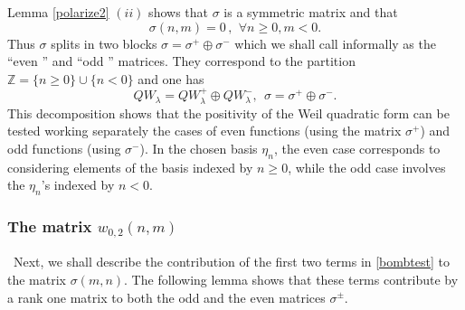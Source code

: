 \documentclass[cupthm]{CUP-JNL-JMJ}
\def\Z{{\mathbb Z}}
\def\qqq{\,,\,~\forall}
\numberwithin{equation}{section}
\theoremstyle{cupplain}
\theoremstyle{cupdefinition}
\theoremstyle{cupremark}
\theoremstyle{cupproof}
\begin{document}
 Lemma \ref{polarize2} $(ii)$  shows that $\sigma$ is a symmetric matrix and that
 $$
 \sigma(n,m)=0\qqq n\geq 0,m< 0.
 $$
 Thus $\sigma$ splits in two blocks $\sigma=\sigma^+\oplus \sigma^-$  which we shall call informally as the ``even '' and  ``odd '' matrices. They correspond to the partition  $\Z=\{n\geq 0\}\cup \{n< 0\} $ and one has
 \begin{equation}\label{weilblocks}
QW_\lambda=QW_\lambda^+\oplus QW_\lambda^-, \ \ \sigma=\sigma^+\oplus \sigma^-.
\end{equation} 
  This decomposition shows that the  positivity of the Weil quadratic form can be tested working separately the cases of  even functions (using the matrix $\sigma^+$)  and odd functions (using $\sigma^-$). In the chosen basis $\eta_n$, the even case corresponds to considering elements of the basis indexed by $n\geq 0$, while  the odd case involves  the $\eta_n$'s indexed by $n< 0$. 
 
 

\subsubsection{The matrix $w_{0,2}(n,m)$}

~Next, we shall describe  the contribution of the first two terms in \eqref{bombtest} to the matrix $\sigma(m,n)$. The following lemma  shows that  these terms contribute by  a rank one matrix to both  the odd and the even  matrices $\sigma^\pm$.
\end{document}

